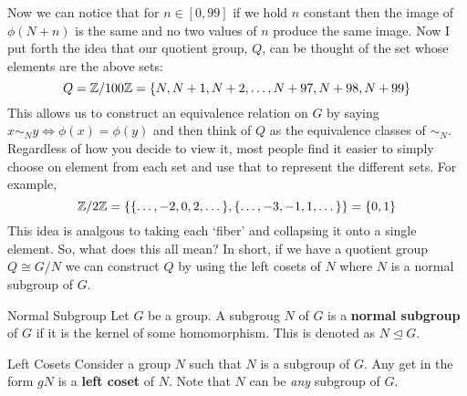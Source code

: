 Now we can notice that for $n \in [0, 99]$ if we hold $n$ constant then the image of $\phi(N + n)$ is the same and no two values of $n$ produce the same image. Now I put forth the idea that our quotient group, $Q$, can be thought of the set whose elements are the above sets: 
\begin{equation}
    Q = \mathbb Z/100\mathbb Z = \{N, N+1, N+2, \dots, N+97, N+98, N+99\}
\end{equation}
This allows us to construct an equivalence relation on $G$ by saying $x \sim_N y \Leftrightarrow \phi(x) = \phi(y)$ and then think of $Q$ as the equivalence classes of $\sim_N$. Regardless of how you decide to view it, most people find it easier to simply choose on element from each set and use that to represent the different sets. For example, 
\begin{equation*}
    \mathbb Z/2\mathbb Z = \{\{\dots, -2, 0, 2, \dots\}, \{\dots, -3, -1, 1, \dots\}\} = \{0, 1\}
\end{equation*}
This idea is analgous to taking each `fiber' and collapsing it onto a single element. So, what does this all mean? In short, if we have a quotient group $Q \cong G/N$ we can construct $Q$ by using the left cosets of $N$ where $N$ is a normal subgroup of $G$. 

\begin{definition}{Normal Subgroup}{}
    Let $G$ be a group. A subgroug $N$ of $G$ is a \textbf{normal subgroup} of $G$ if it is the kernel of some homomorphism. This is denoted as $N \trianglelefteq G$.
\end{definition}

\begin{definition}{Left Cosets}{}
    Consider a group $N$ such that $N$ is a subgroup of $G$. Any get in the form $gN$ is a \textbf{left coset} of $N$. Note that $N$ can be \textit{any} subgroup of $G$.
\end{definition}

